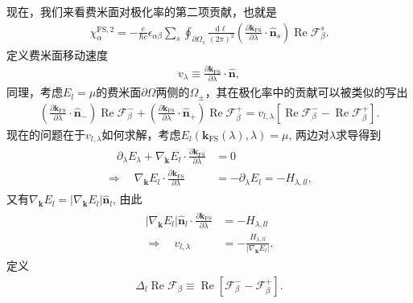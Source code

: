 \documentclass[10pt, oneside]{article}
\begin{document}
现在，我们来看费米面对极化率的第二项贡献，也就是
\begin{align}
	\chi^{\mathrm{FS},2}_{\alpha} = -\frac{e}{\hbar c} \epsilon_{\alpha \beta} \sum_{s } \oint_{\partial \Omega_{s }} \frac{ \mathrm{d} \ell}{\left(2 \pi\right)^{2} } \left(\frac{\partial \bm{k}_{\mathrm{FS}}}{\partial \lambda} \cdot \hat{\bm{n }}_{s}\right) \operatorname{Re} \mathcal{F}_{\beta}^{s}.
\end{align}
定义费米面移动速度
\begin{align}
	v_{\lambda} \equiv \frac{\partial \bm{k}_{\mathrm{FS}}}{\partial \lambda} \cdot \hat{\bm{n}},
\end{align}
同理，考虑\(E_{l} = \mu\)的费米面\(\partial \Omega\)两侧的\(\Omega_{\pm}\)，其在极化率中的贡献可以被类似的写出
\begin{align}
	\left(\frac{\partial \bm{k}_{\mathrm{FS}}}{\partial \lambda} \cdot \hat{\bm{n}}_{-}\right) \operatorname{Re} \mathcal{F}^{-}_{\beta} + \left(\frac{\partial \bm{k}_{\mathrm{FS}}}{\partial \lambda} \cdot \hat{\bm{n}}_{+}\right) \operatorname{Re} \mathcal{F}^{+}_{\beta} = v_{l,\lambda} \left[\operatorname{Re} \mathcal{F}^{-}_{\beta} - \operatorname{Re} \mathcal{F}^{+}_{\beta}\right].
\end{align}
现在的问题在于\(v_{l,\lambda}\)如何求解，考虑\(E_{l} \left(\bm{k}_{\mathrm{FS}} \left(\lambda\right), \lambda\right) = \mu\), 两边对\(\lambda\)求导得到
\begin{align}
	\begin{split}
		\quad \partial_{\lambda} E_{\lambda} + \nabla_{\bm{k}} E_{l} \cdot \frac{\partial \bm{k}_{\mathrm{FS}}}{\partial \lambda} & = 0 \\
		\Rightarrow \quad \nabla_{\bm{k}} E_{l } \cdot \frac{\partial \bm{k}_{\mathrm{FS}}}{\partial \lambda} & = - \partial_{\lambda} E_{l }	= - H_{\lambda,ll},
	\end{split}
\end{align}
又有\(\nabla_{\bm{k }} E_{l } = \left|\nabla_{\bm{k }} E_{l } \right| \hat{\bm{n }}_{l}\), 由此
\begin{align}
	\begin{split}
		\left|\nabla_{\bm{k }} E_{l } \right| \hat{\bm{n }}_{l} \cdot \frac{\partial \bm{k}_{\mathrm{FS}}}{\partial \lambda} &= - H_{\lambda,ll} \\
		\Rightarrow \quad  v_{l,\lambda} &=  - \frac{ H_{\lambda,ll}}{\left|\nabla_{\bm{k}} E_{l}\right|}.
	\end{split}
\end{align}
定义
\begin{align}
	\Delta_{l} \operatorname{Re} \mathcal{F}_{\beta} \equiv \operatorname{Re} \left[\mathcal{F}^{-}_{\beta} - \mathcal{F}^{+}_{\beta}\right].
\end{align}
\end{document}
